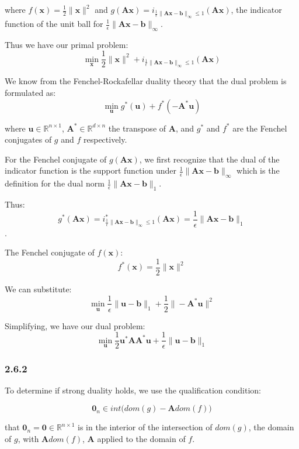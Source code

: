 \documentclass[12pt]{article}
\begin{document}
where $f(\textbf{x}) = \frac{1}{2}\|\textbf{x}\|^2$ and $g(\textbf{Ax}) =  i_{\frac{1}{\epsilon}\|\textbf{A}\textbf{x} - \textbf{b}\|_{\infty} \leq 1}\left(\textbf{Ax}\right)$, the indicator function of the unit ball for $\frac{1}{\epsilon}\|\textbf{A}\textbf{x} - \textbf{b}\|_{\infty}$.

Thus we have our primal problem:
\[\min_{\textbf{x}}  \frac{1}{2}\|\textbf{x}\|^2 + i_{\frac{1}{\epsilon}\|\textbf{A}\textbf{x} - \textbf{b}\|_{\infty} \leq 1}\left(\textbf{Ax}\right)\]


We know from the Fenchel-Rockafellar duality theory that the dual problem is formulated as:
\[\min_{\textbf{u}}  g^*(\textbf{u}) + f^*(-\textbf{A}^*\textbf{u})\]

where $\textbf{u} \in \mathbb{R}^{n \times 1}$, $\textbf{A}^* \in \mathbb{R}^{d\times n}$ the transpose of $\textbf{A}$, and $g^*$ and $f^*$ are the Fenchel conjugates of $g$ and $f$ respectively.

For the Fenchel conjugate of $g(\textbf{Ax})$, we first recognize that the dual of the indicator function is the support function under $\frac{1}{\epsilon}\|\textbf{A}\textbf{x} - \textbf{b}\|_{\infty}$ which is the definition for the dual norm $\frac{1}{\epsilon}\|\textbf{A}\textbf{x} - \textbf{b}\|_{1}$.

Thus:
\[g^*(\textbf{Ax}) = i^*_{\frac{1}{\epsilon}\|\textbf{A}\textbf{x} - \textbf{b}\|_{\infty} \leq 1}\left(\textbf{Ax}\right) = \frac{1}{\epsilon} \| \textbf{A}\textbf{x} - \textbf{b}\|_1\].

The Fenchel conjugate of $f(\textbf{x})$:
\[f^*(\textbf{x}) =  \frac{1}{2}\|\textbf{x}\|^2\]

We can substitute:
\[\min_{\textbf{u}}  \frac{1}{\epsilon} \| \textbf{u} - \textbf{b}\|_1 +  \frac{1}{2}\|-\textbf{A}^*\textbf{u}\|^2\]

Simplifying, we have our dual problem:
\[\min_{\textbf{u}} \frac{1}{2}\textbf{u}^*\textbf{A}\textbf{A}^*\textbf{u} + \frac{1}{\epsilon} \| \textbf{u} - \textbf{b}\|_1\]

\subsubsection*{2.6.2}

To determine if strong duality holds, we use the qualification condition:

\[\textbf{0}_n \in int \big(dom(g) - \textbf{A}dom(f)\big)\]

that $\textbf{0}_n = \textbf{0} \in \mathbb{R}^{n \times 1}$ is in the interior of the intersection of  $dom(g)$, the domain of $g$, with $\textbf{A}dom(f)$, $\textbf{A}$ applied to the domain of $f$.
\end{document}
